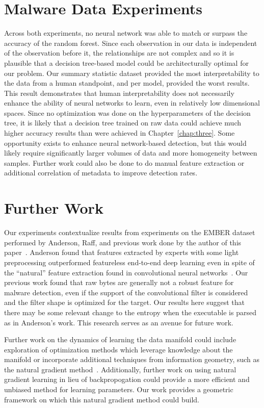 \section{Malware Data Experiments}
Across both experiments, no neural network was able to match or surpass the accuracy of the random forest.
Since each observation in our data is independent of the observation before it, the relationships are not complex and so it is plausible that a decision tree-based model could be architecturally optimal for our problem.
Our summary statistic dataset provided the most interpretability to the data from a human standpoint, and per model, provided the worst results. 
This result demonstrates that human interpretability does not necessarily enhance the ability of neural networks to learn, even in relatively low dimensional spaces.
Since no optimization was done on the hyperparameters of the decision tree, it is likely that a decision tree trained on raw data could achieve much higher accuracy results than were achieved in Chapter~\ref{chap:three}. 
Some opportunity exists to enhance neural network-based detection, but this would likely require significantly larger volumes of data and more homogeneity between samples.
Further work could also be done to do manual feature extraction or additional correlation of metadata to improve detection rates.

\section{Further Work}
Our experiments contextualize results from experiments on the EMBER dataset performed by Anderson, Raff, and previous work done by the author of this paper~\cite{anderson2018ember, raff2018malware, galinkin2019shape}.
Anderson found that features extracted by experts with some light preprocessing outperformed featureless end-to-end deep learning even in spite of the ``natural'' feature extraction found in convolutional neural networks~\cite{he2016deep}.
Our previous work found that raw bytes are generally not a robust feature for malware detection, even if the support of the convolutional filter is considered and the filter shape is optimized for the target.
Our results here suggest that there may be some relevant change to the entropy when the executable is parsed as in Anderson's work.
This research serves as an avenue for future work.

Further work on the dynamics of learning the data manifold could include exploration of optimization methods which leverage knowledge about the manifold or incorporate additional techniques from information geometry, such as the natural gradient method~\cite{amari1998natural, amari2006singularities}.
Additionally, further work on using natural gradient learning in lieu of backpropogation could provide a more efficient and unbiased method for learning parameters.
Our work provides a geometric framework on which this natural gradient method could build.

